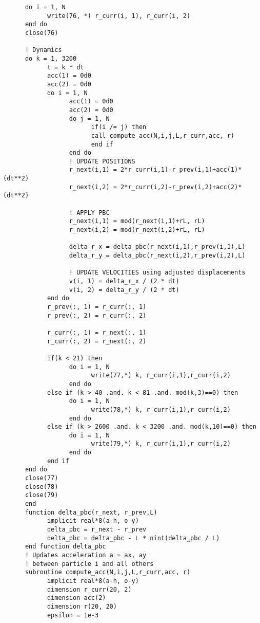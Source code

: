 \begin{verbatim}
      do i = 1, N 
            write(76, *) r_curr(i, 1), r_curr(i, 2)
      end do 
      close(76)

      ! Dynamics 
      do k = 1, 3200 
            t = k * dt 
            acc(1) = 0d0 
            acc(2) = 0d0
            do i = 1, N 
                  acc(1) = 0d0 
                  acc(2) = 0d0
                  do j = 1, N 
                        if(i /= j) then
                        call compute_acc(N,i,j,L,r_curr,acc, r)
                        end if
                  end do 
                  ! UPDATE POSITIONS
                  r_next(i,1) = 2*r_curr(i,1)-r_prev(i,1)+acc(1)*(dt**2)
                  r_next(i,2) = 2*r_curr(i,2)-r_prev(i,2)+acc(2)*(dt**2) 

                  ! APPLY PBC
                  r_next(i,1) = mod(r_next(i,1)+rL, rL)
                  r_next(i,2) = mod(r_next(i,2)+rL, rL)

                  delta_r_x = delta_pbc(r_next(i,1),r_prev(i,1),L)
                  delta_r_y = delta_pbc(r_next(i,2),r_prev(i,2),L)

                  ! UPDATE VELOCITIES using adjusted displacements
                  v(i, 1) = delta_r_x / (2 * dt)
                  v(i, 2) = delta_r_y / (2 * dt)
            end do
            r_prev(:, 1) = r_curr(:, 1)
            r_prev(:, 2) = r_curr(:, 2)
            
            r_curr(:, 1) = r_next(:, 1)
            r_curr(:, 2) = r_next(:, 2)

            if(k < 21) then 
                  do i = 1, N 
                        write(77,*) k, r_curr(i,1),r_curr(i,2)
                  end do
            else if (k > 40 .and. k < 81 .and. mod(k,3)==0) then 
                  do i = 1, N 
                        write(78,*) k, r_curr(i,1),r_curr(i,2)
                  end do
            else if (k > 2600 .and. k < 3200 .and. mod(k,10)==0) then 
                  do i = 1, N 
                        write(79,*) k, r_curr(i,1),r_curr(i,2)
                  end do
            end if 
      end do 
      close(77)
      close(78)
      close(79)
      end
      function delta_pbc(r_next, r_prev,L)
            implicit real*8(a-h, o-y)
            delta_pbc = r_next - r_prev
            delta_pbc = delta_pbc - L * nint(delta_pbc / L)
      end function delta_pbc
      ! Updates acceleration a = ax, ay 
      ! between particle i and all others
      subroutine compute_acc(N,i,j,L,r_curr,acc, r)
            implicit real*8(a-h, o-y)
            dimension r_curr(20, 2)
            dimension acc(2)
            dimension r(20, 20)
            epsilon = 1e-3


\end{verbatim}
